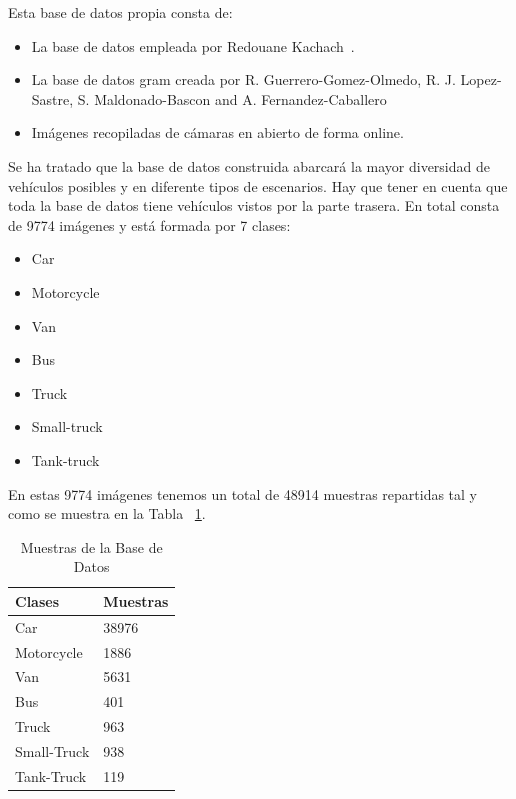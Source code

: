 Esta base de datos propia consta de:
\begin{itemize}
    \item La base de datos empleada por Redouane Kachach~\cite{traffic_monitor_lab}.
    \item La base de datos \acrfull{gram} creada por R. Guerrero-Gomez-Olmedo, R. J. Lopez-Sastre, S. Maldonado-Bascon and A. Fernandez-Caballero~\cite{guerrero2013iwinac} 
    \item Imágenes recopiladas de cámaras en abierto de forma online.
\end{itemize} 

Se ha tratado que la base de datos construida abarcará la mayor diversidad de vehículos posibles y en diferente tipos de escenarios. Hay que tener en cuenta que toda la base de datos tiene vehículos vistos por la parte trasera. En total consta de 9774 imágenes y está formada por 7 clases:
\begin{itemize}
    \item Car
    \item Motorcycle
    \item Van
    \item Bus
    \item Truck
    \item Small-truck
    \item Tank-truck
\end{itemize}

En estas 9774 imágenes tenemos un total de 48914 muestras repartidas tal y como se muestra en la Tabla ~\ref{tabla_muestras}.

\begin{table}[htbp][H] 
\begin{center}
\begin{tabular}{|l|l|}
\hline
Clases & Muestras \\
\hline \hline
Car & 38976 \\ \hline
Motorcycle & 1886 \\ \hline
Van & 5631 \\ \hline
Bus & 401 \\ \hline
Truck & 963 \\ \hline
Small-Truck & 938 \\ \hline
Tank-Truck & 119 \\ \hline
\end{tabular}
\caption{Muestras de la Base de Datos}
\label{tabla_muestras}
\end{center}
\end{table}

